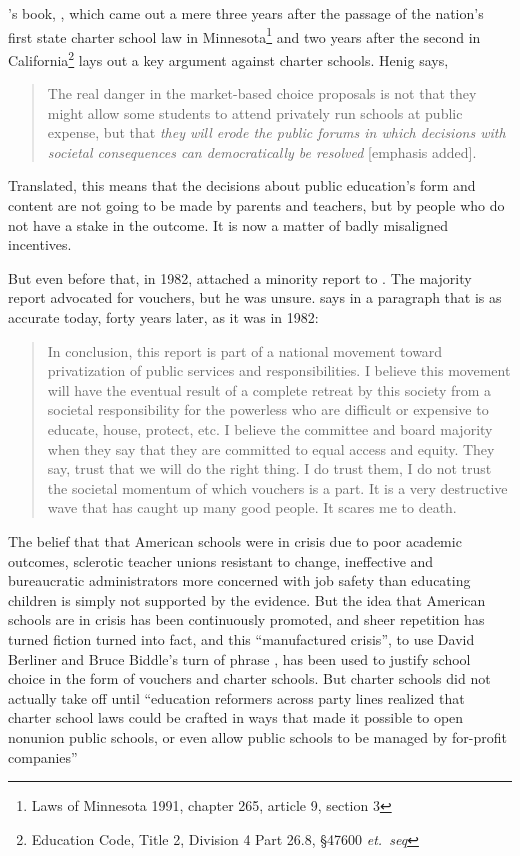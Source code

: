 \textcite{Henig1994}'s book, , which came out a mere three years after the passage of the nation's first state charter school law in Minnesota\footnote{Laws of Minnesota 1991, chapter 265, article 9, section 3} and two years after the second in California\footnote{Education Code, Title 2, Division 4 Part 26.8, §47600 \textit{et.\ seq}} lays out a key argument against charter schools. Henig says,
\blockquote[{\parencite[\emph{xiii}]{Henig1994}}]{\SingleSpacing\vspace{-0.5\baselineskip}%
  The real danger in the market-based choice proposals is not that they might allow some students to attend privately run schools at public expense, but that \emph{they will erode the public forums in which decisions with societal consequences can democratically be resolved} [emphasis added].}
Translated, this means that the decisions about public education's form and content are not going to be made by parents and teachers, but by people who do not have a stake in the outcome. It is now a matter of badly misaligned incentives. %

But even before that, in 1982, \citeauthor{EAC1982} attached a minority report to . The majority report advocated for vouchers, but he was unsure. \citeauthor{EAC1982} says in a paragraph that is as accurate today, forty years later, as it was in 1982: 
\blockquote[{\parencite[48]{EAC1982}}][]{\SingleSpacing\vspace{-0.5\baselineskip}%
In conclusion, this report is part of a national movement toward privatization of public services and responsibilities. I believe this movement will have the eventual result of a complete retreat by this society from a societal responsibility for the powerless who are difficult or expensive to educate, house, protect, etc. I believe the committee and board majority when they say that they are committed to equal access and equity. They say, trust that we will do the right thing. I do trust them, I do not trust the societal momentum of which vouchers is a part. It is a very destructive wave that has caught up many good people. It scares me to death.}

The belief that that American schools were in crisis due to poor academic outcomes, sclerotic teacher unions resistant to change, ineffective and bureaucratic administrators more concerned with job safety than educating children is simply not supported by the evidence. But the idea that American schools are in crisis has been continuously promoted, and sheer repetition has turned fiction turned into fact, and this ``manufactured crisis'', to use David Berliner and Bruce Biddle's turn of phrase \parencite{Berliner.Biddle1997}, has been used to justify school choice in the form of vouchers and charter schools. But charter schools did not actually take off until ``education reformers across party lines realized that charter school laws could be crafted in ways that made it possible to open nonunion public schools, or even allow public schools to be managed by for-profit companies'' \parencite[172]{Goldstein2015}

